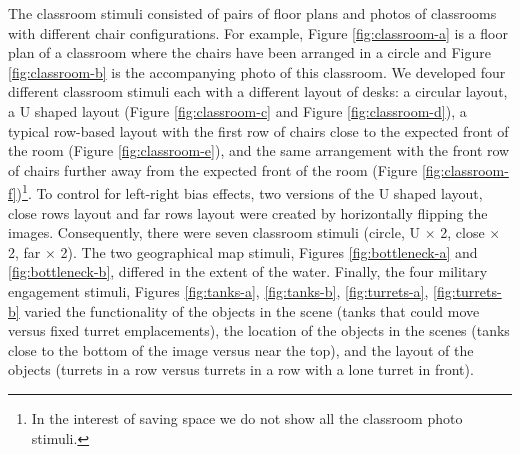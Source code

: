 \documentclass[11pt,letterpaper]{article}
\begin{document}
The classroom stimuli consisted of pairs of floor plans and photos of classrooms with different chair configurations. For example, Figure \ref{fig:classroom-a} is a floor plan of a classroom where the chairs have been arranged in a circle and Figure \ref{fig:classroom-b} is the accompanying photo of this classroom. We developed four different classroom stimuli each with a different layout of desks: a circular layout, a U shaped layout (Figure \ref{fig:classroom-c} and Figure \ref{fig:classroom-d}), a typical row-based layout with the first row of chairs close to the expected front of the room (Figure \ref{fig:classroom-e}), and the same arrangement with the front row of chairs further away from the expected front of the room (Figure \ref{fig:classroom-f})\footnote{In the interest of saving space we do not show all the classroom photo stimuli.}. To control for left-right bias effects, two versions of the U shaped layout, close rows layout and far rows layout were created by horizontally flipping the images. Consequently, there were seven classroom stimuli (circle, U $\times$ 2, close $\times$ 2, far $\times$ 2).  The two geographical map stimuli, Figures \ref{fig:bottleneck-a} and \ref{fig:bottleneck-b}, differed in the extent of the water.  Finally, the four military engagement stimuli, Figures \ref{fig:tanks-a}, \ref{fig:tanks-b}, \ref{fig:turrets-a}, \ref{fig:turrets-b} varied the functionality of the objects in the scene (tanks that could move versus fixed turret emplacements), the location of the objects in the scenes (tanks close to the bottom of the image versus near the top), and the layout of the objects (turrets in a row versus turrets in a row with a lone turret in front). 
\end{document}
